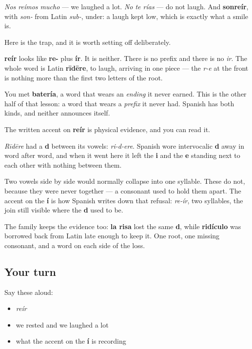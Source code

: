 \emph{Nos reímos mucho} — we laughed a lot. \emph{No te rías} — do not laugh. And \textbf{sonreír}, with \emph{son-} from Latin \emph{sub-}, under: a laugh kept low, which is exactly what a smile is.

\begin{cousinweb}
Here is the trap, and it is worth setting off deliberately.

\textbf{reír} looks like \textbf{re-} plus \textbf{ír}. It is neither. There is no prefix and there is no \emph{ir}. The whole word is Latin \textbf{rīdēre}, to laugh, arriving in one piece — the \emph{r-e} at the front is nothing more than the first two letters of the root.

You met \textbf{batería}, a word that wears an \emph{ending} it never earned. This is the other half of that lesson: a word that wears a \emph{prefix} it never had. Spanish has both kinds, and neither announces itself.
\end{cousinweb}

\begin{culture}
The written accent on \textbf{reír} is physical evidence, and you can read it.

\emph{Rīdēre} had a \textbf{d} between its vowels: \emph{ri-d-ere}. Spanish wore intervocalic \textbf{d} away in word after word, and when it went here it left the \textbf{i} and the \textbf{e} standing next to each other with nothing between them.

Two vowels side by side would normally collapse into one syllable. These do not, because they were never together — a consonant used to hold them apart. The accent on the \textbf{í} is how Spanish writes down that refusal: \emph{re-ír}, two syllables, the join still visible where the \textbf{d} used to be.

The family keeps the evidence too: \textbf{la risa} lost the same \textbf{d}, while \textbf{ridículo} was borrowed back from Latin late enough to keep it. One root, one missing consonant, and a word on each side of the loss.
\end{culture}

\subsection*{Your turn}
Say these aloud:

\begin{itemize}
\raggedright
  \item \emph{reír}
  \item we rested and we laughed a lot
  \item what the accent on the \textbf{í} is recording
\end{itemize}

